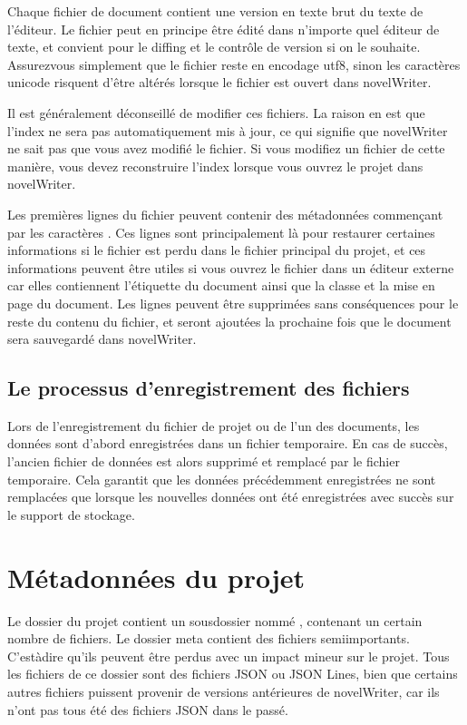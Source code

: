 \documentclass[a4paper,11pt,french]{sphinxmanual}
\begin{document}
\sphinxAtStartPar
Chaque fichier de document contient une version en texte brut du texte de l’éditeur. Le fichier peut en principe être édité dans n’importe quel éditeur de texte, et convient pour le diffing et le contrôle de version si on le souhaite. Assurez\sphinxhyphen{}vous simplement que le fichier reste en encodage utf\sphinxhyphen{}8, sinon les caractères unicode risquent d’être altérés lorsque le fichier est ouvert dans novelWriter.

\sphinxAtStartPar
Il est généralement déconseillé de modifier ces fichiers. La raison en est que l’index ne sera pas automatiquement mis à jour, ce qui signifie que novelWriter ne sait pas que vous avez modifié le fichier. Si vous modifiez un fichier de cette manière, vous devez reconstruire l’index lorsque vous ouvrez le projet dans novelWriter.

\sphinxAtStartPar
Les premières lignes du fichier peuvent contenir des métadonnées commençant par les caractères \sphinxcode{\sphinxupquote{\%\%\textasciitilde{}}}. Ces lignes sont principalement là pour restaurer certaines informations si le fichier est perdu dans le fichier principal du projet, et ces informations peuvent être utiles si vous ouvrez le fichier dans un éditeur externe car elles contiennent l’étiquette du document ainsi que la classe et la mise en page du document. Les lignes peuvent être supprimées sans conséquences pour le reste du contenu du fichier, et seront ajoutées la prochaine fois que le document sera sauvegardé dans novelWriter.


\subsection{Le processus d’enregistrement des fichiers}
\label{\detokenize{tech_storage:the-file-saving-process}}
\sphinxAtStartPar
Lors de l’enregistrement du fichier de projet ou de l’un des documents, les données sont d’abord enregistrées dans un fichier temporaire. En cas de succès, l’ancien fichier de données est alors supprimé et remplacé par le fichier temporaire. Cela garantit que les données précédemment enregistrées ne sont remplacées que lorsque les nouvelles données ont été enregistrées avec succès sur le support de stockage.


\section{Métadonnées du projet}
\label{\detokenize{tech_storage:project-meta-data}}
\sphinxAtStartPar
Le dossier du projet contient un sous\sphinxhyphen{}dossier nommé , contenant un certain nombre de fichiers. Le dossier meta contient des fichiers semi\sphinxhyphen{}importants. C’est\sphinxhyphen{}à\sphinxhyphen{}dire qu’ils peuvent être perdus avec un impact mineur sur le projet. Tous les fichiers de ce dossier sont des fichiers JSON ou JSON Lines, bien que certains autres fichiers puissent provenir de versions antérieures de novelWriter, car ils n’ont pas tous été des fichiers JSON dans le passé.
\end{document}
